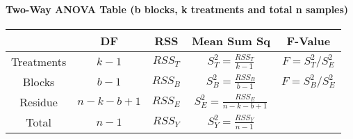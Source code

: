 \paragraph{Two-Way ANOVA Table (b blocks, k treatments and total n samples)}
\begin{table}[ht]
	\centering
	\begin{tabular}{|c|c|c|c|c|}
			 & DF & RSS & Mean Sum Sq & F-Value \\
			\hline
			Treatments & $k-1$ & $RSS_T$& $S^2_T=\frac{RSS_T}{k-1}$ & $F=S^2_T/S^2_E$\\
			Blocks & $b-1$ & $RSS_B$ & $S_B^2=\frac{RSS_B}{b-1}$ & $F=S^2_B/S^2_E$\\
			Residue & $n-k-b+1$ & $RSS_E$ & $S_E^2=\frac{RSS_E}{n-k-b+1}$ & \\
			Total & $n-1$ & $RSS_Y$ & $S_Y^2=\frac{RSS_Y}{n-1}$& \\
	\end{tabular}
\end{table}

